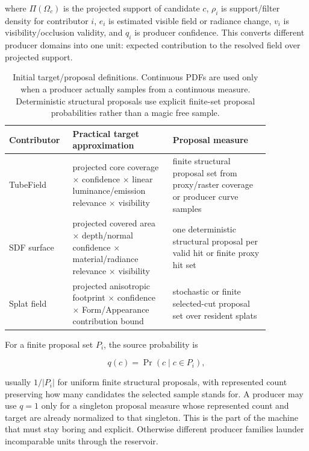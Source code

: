 \documentclass[11pt]{article}
\newcommand{\Pdf}{q}
\begin{document}
where \(\Pi(\Omega_c)\) is the projected support of candidate \(c\), \(\rho_i\)
is support/filter density for contributor \(i\), \(e_i\) is estimated visible
field or radiance change, \(v_i\) is visibility/occlusion validity, and
\(q_i\) is producer confidence.  This converts different producer domains into
one unit: expected contribution to the resolved field over projected support.

\begin{table}[t]
\centering
\begin{tabular}{p{0.17\linewidth}p{0.35\linewidth}p{0.34\linewidth}}
\toprule
Contributor & Practical target approximation & Proposal measure \\
\midrule
TubeField & projected core coverage \(\times\) confidence \(\times\)
linear luminance/emission relevance \(\times\) visibility
& finite structural proposal set from proxy/raster coverage or producer curve
samples \\
SDF surface & projected covered area \(\times\) depth/normal confidence
\(\times\) material/radiance relevance \(\times\) visibility
& one deterministic structural proposal per valid hit or finite proxy hit set \\
Splat field & projected anisotropic footprint \(\times\) confidence
\(\times\) Form/Appearance contribution bound
& stochastic or finite selected-cut proposal set over resident splats \\
\bottomrule
\end{tabular}
\caption{Initial target/proposal definitions.  Continuous PDFs are used only
when a producer actually samples from a continuous measure.  Deterministic
structural proposals use explicit finite-set proposal probabilities rather than
a magic free sample.}
\label{tab:target}
\end{table}

For a finite proposal set \(P_i\), the source probability is

\begin{equation}
  \Pdf(c) = \Pr(c \mid c \in P_i),
\end{equation}

usually \(1/|P_i|\) for uniform finite structural proposals, with represented
count preserving how many candidates the selected sample stands for.  A producer
may use \(\Pdf=1\) only for a singleton proposal measure whose represented
count and target are already normalized to that singleton.  This is the part of
the machine that must stay boring and explicit.  Otherwise different producer
families launder incomparable units through the reservoir.
\end{document}
